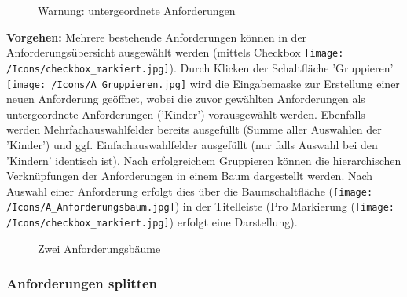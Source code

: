 \begin{figure}[H]
\caption{Warnung: untergeordnete Anforderungen}
\end{figure}

\textbf{Vorgehen:}
Mehrere bestehende Anforderungen können in der Anforderungsübersicht ausgewählt werden (mittels Checkbox \texttt{[image: /Icons/checkbox\_markiert.jpg]}). Durch Klicken der Schaltfläche 'Gruppieren' \texttt{[image: /Icons/A\_Gruppieren.jpg]} wird die Eingabemaske zur Erstellung einer neuen Anforderung geöffnet, wobei die zuvor gewählten Anforderungen als untergeordnete Anforderungen ('Kinder') vorausgewählt werden. Ebenfalls werden Mehrfachauswahlfelder bereits ausgefüllt (Summe aller Auswahlen der 'Kinder') und ggf. Einfachauswahlfelder ausgefüllt (nur falls Auswahl bei den 'Kindern' identisch ist).
Nach erfolgreichem Gruppieren können die hierarchischen Verknüpfungen der Anforderungen in einem Baum dargestellt werden. Nach Auswahl einer Anforderung erfolgt dies über die Baumschaltfläche (\texttt{[image: /Icons/A\_Anforderungsbaum.jpg]}) in der Titelleiste (Pro Markierung (\texttt{[image: /Icons/checkbox\_markiert.jpg]}) erfolgt eine Darstellung).

\begin{figure}[H]
\caption{Zwei Anforderungsbäume}
\end{figure}

\subsubsection{Anforderungen splitten}

